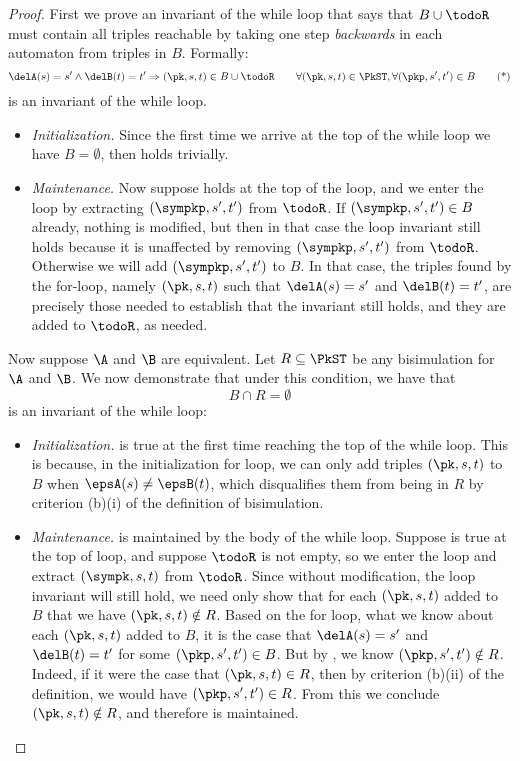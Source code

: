 \bkwdcorrect*
\begin{proof}
First we prove an invariant of the while loop that says that $B \cup \todoR$ must contain
all triples reachable by taking one step \emph{backwards} in each automaton from
triples in $B$. Formally:
\[ \delA(s) = s'\wedge \delB(t)=t' \Rightarrow (\pk, s, t)\in B \cup \todoR\qquad\forall
    (\pk, s, t)\in\PkST, \forall (\pkp, s', t')\in B
    \tag{*}\label{bkwd-i1} \]
is an invariant of the while loop.
\begin{itemize}
\item \emph{Initialization.} Since the first time we arrive at the top of the
while loop we have $B = \emptyset$, then  holds trivially.
\item \emph{Maintenance.} Now suppose  holds at the top of the loop,
and we enter the loop by extracting $(\sympkp, s', t')$ from $\todoR$.
If $(\sympkp, s', t')\in B$ already, nothing is modified, but then in that case
the loop invariant still holds because it is unaffected by removing
$(\sympkp,s',t')$ from $\todoR$. Otherwise we will add $(\sympkp, s',t')$ to $B$.
In that case, the triples found by
the for-loop, namely $(\pk, s, t)$ such that $\delA(s) = s'$ and $\delB(t) = t'$, are
precisely those needed to establish that the invariant still holds, and they are
added to $\todoR$, as needed.
\end{itemize}

Now suppose $\A$ and $\B$ are equivalent.
Let $R\subseteq\PkST$ be any bisimulation for $\A$ and $\B$.
We now demonstrate that under this condition, we have that
\[ B \cap R = \emptyset \tag{**}\label{bkwd-i2} \]
is an invariant of the while loop:
\begin{itemize}
\item \emph{Initialization.}  is true at the first time reaching the top
of the while loop. This is because, in the initialization for loop,
we can only add triples $(\pk, s, t)$ to $B$ when $\epsA(s) \neq \epsB(t)$,
which disqualifies them from being in $R$ by criterion (b)(i) of the definition
of bisimulation.
\item \emph{Maintenance.}  is maintained by the body of the while loop.
Suppose  is true at the top of loop, and suppose $\todoR$ is not
empty, so we enter the loop and extract $(\sympk, s, t)$ from $\todoR$.
Since without modification, the loop invariant will still hold, we need only
show that for each $(\pk, s, t)$ added to $B$ that we have $(\pk, s, t)\notin
R$. Based on the for loop, what we know about each $(\pk, s, t)$ added to $B$,
it is the case that $\delA(s) = s'$ and $\delB(t) = t'$ for some $(\pkp,s',t')
\in B$. But by , we know $(\pkp,s',t')\notin R$. Indeed, if it
were the case that $(\pk,s,t)\in R$, then by criterion (b)(ii) of the
definition, we would have $(\pkp,s',t')\in R$. From this we conclude $(\pk, s,
t)\notin R$, and therefore  is maintained.
\end{itemize}


\end{proof}
